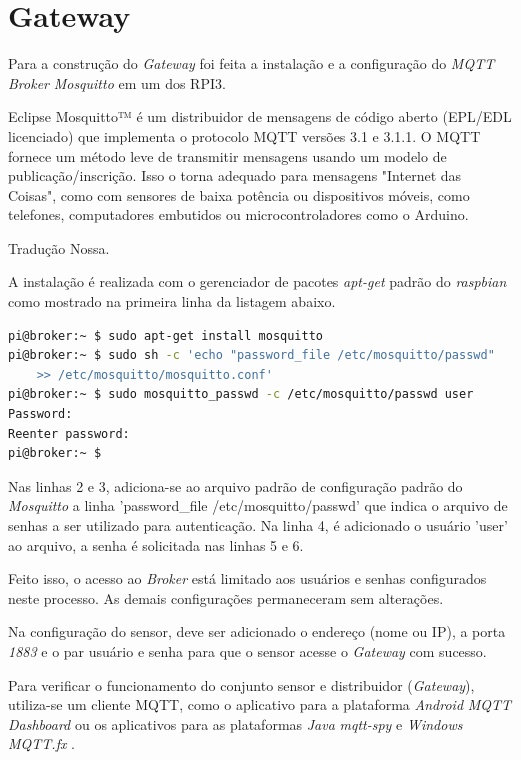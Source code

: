 \section{Gateway}
\label{sec:app-gw}

Para a construção do \emph{Gateway} foi feita a instalação e a configuração do
\emph{MQTT Broker} \emph{Mosquitto} em um dos RPI3.

\begin{citacao}

	Eclipse Mosquitto™ é um distribuidor de mensagens de código aberto (EPL/EDL
	licenciado) que implementa o protocolo MQTT versões 3.1 e 3.1.1. O MQTT
	fornece um método leve de transmitir mensagens usando um modelo de
	publicação/inscrição. Isso o torna adequado para mensagens "Internet das
	Coisas", como com sensores de baixa potência ou dispositivos móveis, como
	telefones, computadores embutidos ou microcontroladores como o Arduino. \

	 Tradução Nossa.
\end{citacao}


A instalação é realizada com o gerenciador de pacotes \emph{apt-get} padrão do
\emph{raspbian} como mostrado na primeira linha da listagem abaixo.

\begin{lstlisting}[language=bash,caption={Instalação e configuração do Mosquitto},label=code-mosquitto]
pi@broker:~ $ sudo apt-get install mosquitto
pi@broker:~ $ sudo sh -c 'echo "password_file /etc/mosquitto/passwd"
	>> /etc/mosquitto/mosquitto.conf'
pi@broker:~ $ sudo mosquitto_passwd -c /etc/mosquitto/passwd user
Password:
Reenter password:
pi@broker:~ $
\end{lstlisting}

Nas linhas 2 e 3, adiciona-se ao arquivo padrão de configuração padrão do
\emph{Mosquitto} a linha 'password\_file /etc/mosquitto/passwd' que
indica o arquivo de senhas a ser utilizado para autenticação. Na linha 4, é
adicionado o usuário 'user' ao arquivo, a senha é solicitada  nas
linhas 5 e 6.

Feito isso, o acesso ao \emph{Broker} está limitado aos usuários e senhas
configurados neste processo. As demais configurações permaneceram sem alterações.

Na configuração do sensor, deve ser adicionado o endereço (nome ou IP), a porta
\emph{1883} e o par usuário e senha para que o sensor acesse o \emph{Gateway} com
sucesso.

Para verificar o funcionamento do conjunto sensor e distribuidor (\emph{Gateway}), utiliza-se um
cliente MQTT, como o aplicativo para a plataforma \emph{Android} \emph{MQTT Dashboard}
\cite{mqttdash} ou os aplicativos para as plataformas \emph{Java} \emph{mqtt-spy}
\cite{mqttspy} e \emph{Windows} \emph{MQTT.fx} \cite{mqttfx}.

